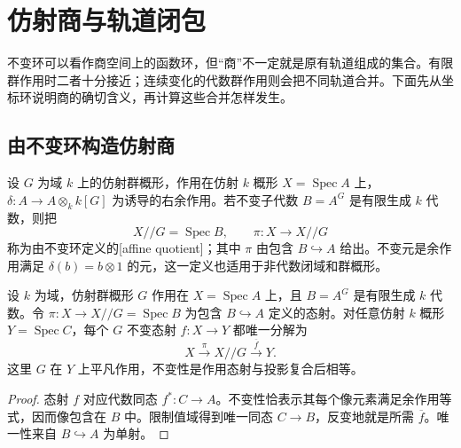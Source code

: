 %
%
\section{仿射商与轨道闭包}
\label{b5:sec:2206}

不变环可以看作商空间上的函数环，但“商”不一定就是原有轨道组成的集合。有限群作用时二者十分接近；连续变化的代数群作用则会把不同轨道合并。下面先从坐标环说明商的确切含义，再计算这些合并怎样发生。

\subsection{由不变环构造仿射商}
\label{b5:subsec:2206:01}

\begin{definition}\label{b5:def:affine-invariant-quotient}
	设 \(G\) 为域 \(k\) 上的仿射群概形，作用在仿射 \(k\) 概形 \(X=\operatorname{Spec}A\) 上，\(\delta:A\to A\otimes_k k[G]\) 为诱导的右余作用。若不变子代数 \(B=A^G\) 是有限生成 \(k\) 代数，则把
	\[
		X/\!/G=\operatorname{Spec}B,\qquad \pi:X\longrightarrow X/\!/G
	\]
	称为由不变环定义的[affine quotient]；其中 \(\pi\) 由包含 \(B\hookrightarrow A\) 给出。不变元是余作用满足 \(\delta(b)=b\otimes1\) 的元，这一定义也适用于非代数闭域和群概形。
\end{definition}

\begin{proposition}\label{b5:prop:affine-quotient-universal}
	设 \(k\) 为域，仿射群概形 \(G\) 作用在 \(X=\operatorname{Spec}A\) 上，且 \(B=A^G\) 是有限生成 \(k\) 代数。令 \(\pi:X\to X/\!/G=\operatorname{Spec}B\) 为包含 \(B\hookrightarrow A\) 定义的态射。对任意仿射 \(k\) 概形 \(Y=\operatorname{Spec}C\)，每个 \(G\) 不变态射 \(f:X\to Y\) 都唯一分解为
	\[
		X\xrightarrow{\pi}X/\!/G\xrightarrow{\overline f}Y.
	\]
	这里 \(G\) 在 \(Y\) 上平凡作用，不变性是作用态射与投影复合后相等。
\end{proposition}
\begin{proof}
	态射 \(f\) 对应代数同态 \(f^*:C\to A\)。不变性恰表示其每个像元素满足余作用等式，因而像包含在 \(B\) 中。限制值域得到唯一同态 \(C\to B\)，反变地就是所需 \(\overline f\)。唯一性来自 \(B\hookrightarrow A\) 为单射。
\end{proof}

